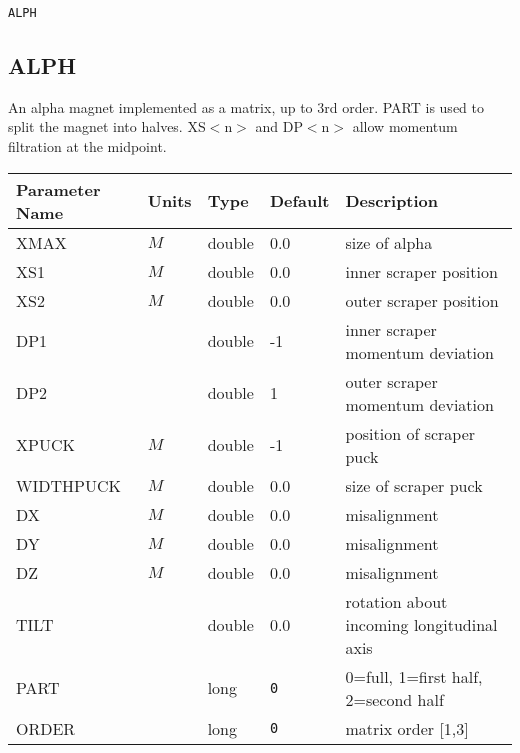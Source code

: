 \newlength{\descwidth}
\setlength{\descwidth}{2in}
\begin{latexonly}
\newpage
\begin{center}{\Large\verb|ALPH|}\end{center}
\end{latexonly}\subsection{ALPH}
An alpha magnet implemented as a matrix, up to 3rd order.  PART is used to split
the magnet into halves.  XS$<$n$>$ and DP$<$n$>$ allow momentum filtration at the midpoint.
\\
\begin{tabular}{|l|l|l|l|p{\descwidth}|} \hline
Parameter Name & Units & Type & Default & Description \\ \hline 
XMAX & $M$ & double &  0.0 & size of alpha  \\ \hline 
XS1 & $M$ & double &  0.0 & inner scraper position  \\ \hline 
XS2 & $M$ & double &  0.0 & outer scraper position  \\ \hline 
DP1 &  & double &   -1 & inner scraper momentum deviation  \\ \hline 
DP2 &  & double &   1 & outer scraper momentum deviation  \\ \hline 
XPUCK & $M$ & double &   -1 & position of scraper puck  \\ \hline 
WIDTHPUCK & $M$ & double &  0.0 & size of scraper puck  \\ \hline 
DX & $M$ & double &  0.0 & misalignment  \\ \hline 
DY & $M$ & double &  0.0 & misalignment  \\ \hline 
DZ & $M$ & double &  0.0 & misalignment  \\ \hline 
TILT &  & double &  0.0 & rotation about incoming longitudinal axis  \\ \hline 
PART &  & long &  \verb|0| & 0=full, 1=first half, 2=second half  \\ \hline 
ORDER &  & long &  \verb|0| & matrix order [1,3]  \\ \hline 
\end{tabular}

